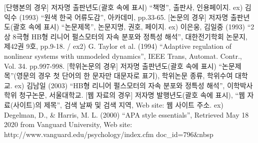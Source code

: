 \documentclass[10pt]{gshs-report-v2.0}
\begin{document}

\noindent{}


\begin{thebibliography}{99}
 [단행본의 경우] 저자명 출판년도(괄호 속에 표시) ``책명'', 출판사, 인용페이지. ex) 김익수 (1993) ``원색 한국 어류도감'', 아카데미, pp.33-65. 
 [논문의 경우] 저자명 출판년도(괄호 속에 표시) ``논문제목'', 논문지명, 권호, 페이지. ex) 이은웅, 김일중 (1993) ``2상 8극형 HB형 리니어 펄스모터의 자속 분포와 정특성 해석'', 대한전기학회 논문지, 제42권 9호, pp.9-18. / ex2) G. Taylor et al. (1994) ``Adaptive regulation of nonlinear systems with unmodeled dynamics'', IEEE Trans, Automat. Contr., Vol. 34. pp.997-998.
 [학위논문의 경우] 저자명 출판년도(괄호 속에 표시) ``논문제목''(영문의 경우 첫 단어의 한 문자만 대문자로 표기), 학위논문 종류, 학위수여 대학교. ex) 김남일 (2003) ``HB형 리니어 펄스모터의 자속 분포와 정특성 해석'', 이학박사 학위 청구논문, 서울대학교. 
 [웹 자료의 경우] 저자명 발행년도(괄호 속에 표시), ``웹 자료(사이트)의 제목'', 검색 날짜 및 검색 지역, Web site: 웹 사이트 주소. ex) Degelman, D., \& Harris, M. L. (2000) “APA style essentials”, Retrieved May 18 2020 from Vanguard University, Web site: http://www.vanguard.edu/psychology/index.cfm doc\_id=796\&nbsp %


\end{thebibliography}
\end{document}
